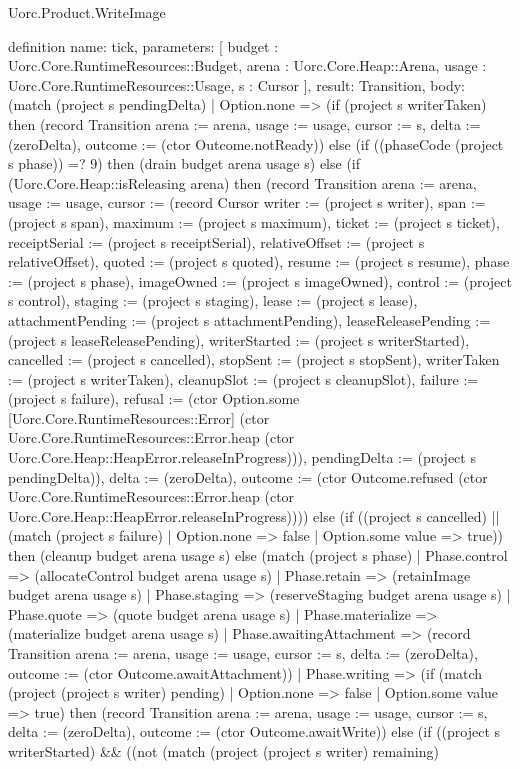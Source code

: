 \begin{lexlean}{Uorc.Product.WriteImage}
\begin{semanticmodule}
definition{
  name: tick,
  parameters: [
    budget : Uorc.Core.RuntimeResources::Budget,
    arena : Uorc.Core.Heap::Arena,
    usage : Uorc.Core.RuntimeResources::Usage,
    s : Cursor
  ],
  result: Transition,
  body: (match (project s pendingDelta)
    | Option.none => (if (project s writerTaken) then (record Transition {arena := arena, usage := usage, cursor := s, delta := (zeroDelta), outcome := (ctor Outcome.notReady)}) else (if ((phaseCode (project s phase)) =? 9) then (drain budget arena usage s) else (if (Uorc.Core.Heap::isReleasing arena) then (record Transition {arena := arena, usage := usage, cursor := (record Cursor {writer := (project s writer), span := (project s span), maximum := (project s maximum), ticket := (project s ticket), receiptSerial := (project s receiptSerial), relativeOffset := (project s relativeOffset), quoted := (project s quoted), resume := (project s resume), phase := (project s phase), imageOwned := (project s imageOwned), control := (project s control), staging := (project s staging), lease := (project s lease), attachmentPending := (project s attachmentPending), leaseReleasePending := (project s leaseReleasePending), writerStarted := (project s writerStarted), cancelled := (project s cancelled), stopSent := (project s stopSent), writerTaken := (project s writerTaken), cleanupSlot := (project s cleanupSlot), failure := (project s failure), refusal := (ctor Option.some [Uorc.Core.RuntimeResources::Error] (ctor Uorc.Core.RuntimeResources::Error.heap (ctor Uorc.Core.Heap::HeapError.releaseInProgress))), pendingDelta := (project s pendingDelta)}), delta := (zeroDelta), outcome := (ctor Outcome.refused (ctor Uorc.Core.RuntimeResources::Error.heap (ctor Uorc.Core.Heap::HeapError.releaseInProgress)))}) else (if ((project s cancelled) || (match (project s failure)
      | Option.none => false
      | Option.some value => true)) then (cleanup budget arena usage s) else (match (project s phase)
      | Phase.control => (allocateControl budget arena usage s)
      | Phase.retain => (retainImage budget arena usage s)
      | Phase.staging => (reserveStaging budget arena usage s)
      | Phase.quote => (quote budget arena usage s)
      | Phase.materialize => (materialize budget arena usage s)
      | Phase.awaitingAttachment => (record Transition {arena := arena, usage := usage, cursor := s, delta := (zeroDelta), outcome := (ctor Outcome.awaitAttachment)})
      | Phase.writing => (if (match (project (project s writer) pending)
        | Option.none => false
        | Option.some value => true) then (record Transition {arena := arena, usage := usage, cursor := s, delta := (zeroDelta), outcome := (ctor Outcome.awaitWrite)}) else (if ((project s writerStarted) && ((not (match (project (project s writer) remaining)
}
\end{semanticmodule}
\end{lexlean}
